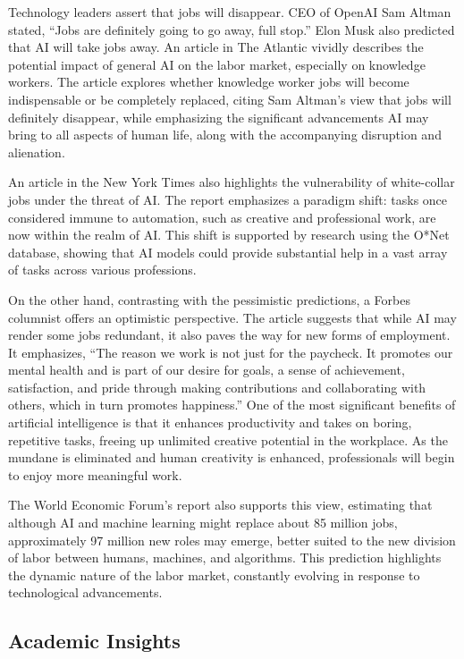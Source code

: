 \documentclass[11pt]{article}
\begin{document}
Technology leaders assert that jobs will disappear. CEO of OpenAI Sam Altman stated, “Jobs are definitely going to go away, full stop.” Elon Musk also predicted that AI will take jobs away. An article in The Atlantic vividly describes the potential impact of general AI on the labor market, especially on knowledge workers. The article explores whether knowledge worker jobs will become indispensable or be completely replaced, citing Sam Altman's view that jobs will definitely disappear, while emphasizing the significant advancements AI may bring to all aspects of human life, along with the accompanying disruption and alienation.\cite{Andersen2023} 

An article in the New York Times also highlights the vulnerability of white-collar jobs under the threat of AI. The report emphasizes a paradigm shift: tasks once considered immune to automation, such as creative and professional work, are now within the realm of AI. This shift is supported by research using the O*Net database, showing that AI models could provide substantial help in a vast array of tasks across various professions.\cite{Miller2023}

On the other hand, contrasting with the pessimistic predictions, a Forbes columnist offers an optimistic perspective. The article suggests that while AI may render some jobs redundant, it also paves the way for new forms of employment. It emphasizes, “The reason we work is not just for the paycheck. It promotes our mental health and is part of our desire for goals, a sense of achievement, satisfaction, and pride through making contributions and collaborating with others, which in turn promotes happiness.” One of the most significant benefits of artificial intelligence is that it enhances productivity and takes on boring, repetitive tasks, freeing up unlimited creative potential in the workplace. As the mundane is eliminated and human creativity is enhanced, professionals will begin to enjoy more meaningful work.\cite{Wells2023}

The World Economic Forum's report also supports this view, estimating that although AI and machine learning might replace about 85 million jobs, approximately 97 million new roles may emerge, better suited to the new division of labor between humans, machines, and algorithms. This prediction highlights the dynamic nature of the labor market, constantly evolving in response to technological advancements.\cite{Goldberg2023}

\subsection{Academic Insights}
\end{document}
